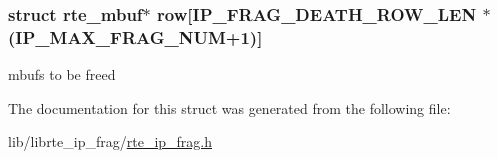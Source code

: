 \subsubsection[{row}]{\setlength{\rightskip}{0pt plus 5cm}struct {\bf rte\+\_\+mbuf}$\ast$ row\mbox{[}{\bf I\+P\+\_\+\+F\+R\+A\+G\+\_\+\+D\+E\+A\+T\+H\+\_\+\+R\+O\+W\+\_\+\+L\+E\+N} $\ast$({\bf I\+P\+\_\+\+M\+A\+X\+\_\+\+F\+R\+A\+G\+\_\+\+N\+U\+M}+1)\mbox{]}}\label{structrte__ip__frag__death__row_adbd3344a72dfab0c09734b282c0a4f2b}
mbufs to be freed 

The documentation for this struct was generated from the following file\+:\begin{DoxyCompactItemize}
\item 
lib/librte\+\_\+ip\+\_\+frag/\hyperlink{rte__ip__frag_8h}{rte\+\_\+ip\+\_\+frag.\+h}\end{DoxyCompactItemize}
